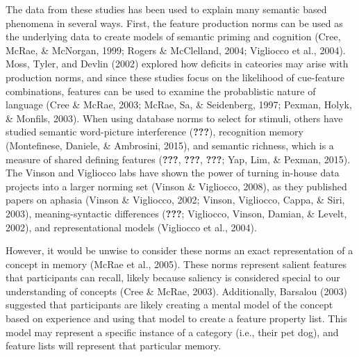 \documentclass[english,man]{apa6}
\theoremstyle{definition}
\theoremstyle{definition}
\theoremstyle{definition}
\theoremstyle{remark}
\begin{document}
The data from these studies has been used to explain many semantic based
phenomena in several ways. First, the feature production norms can be
used as the underlying data to create models of semantic priming and
cognition (Cree, McRae, \& McNorgan, 1999; Rogers \& McClelland, 2004;
Vigliocco et al., 2004). Moss, Tyler, and Devlin (2002) explored how
deficits in cateories may arise with production norms, and since these
studies focus on the likelihood of cue-feature combinations, features
can be used to examine the probablistic nature of language (Cree \&
McRae, 2003; McRae, Sa, \& Seidenberg, 1997; Pexman, Holyk, \& Monfils,
2003). When using database norms to select for stimuli, others have
studied semantic word-picture interference ({\textbf{???}}), recognition
memory (Montefinese, Daniele, \& Ambrosini, 2015), and semantic
richness, which is a measure of shared defining features
({\textbf{???}}, {\textbf{???}}, {\textbf{???}}; Yap, Lim, \& Pexman,
2015). The Vinson and Vigliocco labs have shown the power of turning
in-house data projects into a larger norming set (Vinson \& Vigliocco,
2008), as they published papers on aphasia (Vinson \& Vigliocco, 2002;
Vinson, Vigliocco, Cappa, \& Siri, 2003), meaning-syntactic differences
({\textbf{???}}; Vigliocco, Vinson, Damian, \& Levelt, 2002), and
representational models (Vigliocco et al., 2004).

However, it would be unwise to consider these norms an exact
representation of a concept in memory (McRae et al., 2005). These norms
represent salient features that participants can recall, likely because
saliency is considered special to our understanding of concepts (Cree \&
McRae, 2003). Additionally, Barsalou (2003) suggested that participants
are likely creating a mental model of the concept based on experience
and using that model to create a feature property list. This model may
represent a specific instance of a category (i.e., their pet dog), and
feature lists will represent that particular memory.
\end{document}
